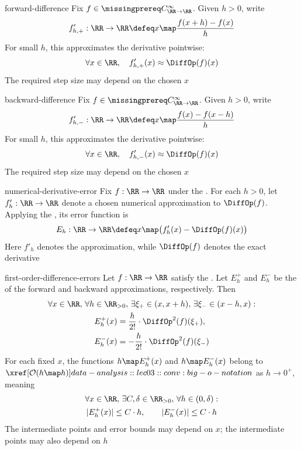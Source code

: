 \documentclass[12pt]{article}
\numberwithin{figure}{section}
\begin{document}

\begin{conv}{forward-difference}
  Fix $f\in\SmoothRealFunctions$. Given $h>0$, write
  \[
    f'_{h,+}:\RR\to\RR
      \defeq x\map\frac{f(x+h)-f(x)}{h}
  \]
  For small $h$, this approximates the derivative pointwise:
  \[
    \forall x\in\RR,\quad f'_{h,+}(x)\approx\DiffOp(f)(x)
  \]
  The required step size may depend on the chosen $x$
\end{conv}

\begin{conv}{backward-difference}
  Fix $f\in\SmoothRealFunctions$. Given $h>0$, write
  \[
    f'_{h,-}:\RR\to\RR
      \defeq x\map\frac{f(x)-f(x-h)}{h}
  \]
  For small $h$, this approximates the derivative pointwise:
  \[
    \forall x\in\RR,\quad f'_{h,-}(x)\approx\DiffOp(f)(x)
  \]
  The required step size may depend on the chosen $x$
\end{conv}

\begin{dfn}{numerical-derivative-error}
  Fix $f:\RR\to\RR$ under the
  .
  For each $h>0$, let $f'_h:\RR\to\RR$ denote a chosen numerical
  approximation to $\DiffOp(f)$. Applying the
  , its error function is
  \[
    E_h:\RR\to\RR
      \defeq x\map\bigl(f'_h(x)-\DiffOp(f)(x)\bigr)
  \]
  Here $f'_h$ denotes the approximation, while $\DiffOp(f)$ denotes
  the exact derivative
\end{dfn}

\begin{prop}{first-order-difference-errors}
  Let $f:\RR\to\RR$ satisfy the
  .
  Let $E_h^+$ and $E_h^-$ be the
   of the forward
  and backward approximations, respectively. Then
  \[
    \begin{gathered}
      \forall x\in\RR,\,\forall h\in\RR_{>0},\,
      \exists\xi_+\in(x,x+h),\,\exists\xi_-\in(x-h,x):\\
      \begin{aligned}
        E_h^+(x)&=\frac{h}{2!}\cdot\DiffOp^2(f)(\xi_+),\\
        E_h^-(x)&=-\frac{h}{2!}\cdot\DiffOp^2(f)(\xi_-)
      \end{aligned}
    \end{gathered}
  \]
  For each fixed $x$, the functions $h\map E_h^+(x)$ and
  $h\map E_h^-(x)$ belong to $\OrderOf{h\map h}$ as
  $h\to0^+$, meaning
  \[
    \begin{gathered}
      \forall x\in\RR,\,\exists C,\delta\in\RR_{>0},\,
      \forall h\in(0,\delta):\\
      |E_h^+(x)|\leq C\cdot h,\qquad
      |E_h^-(x)|\leq C\cdot h
    \end{gathered}
  \]
  The intermediate points and error bounds may depend on $x$;
  the intermediate points may also depend on $h$
\end{prop}
\end{document}
